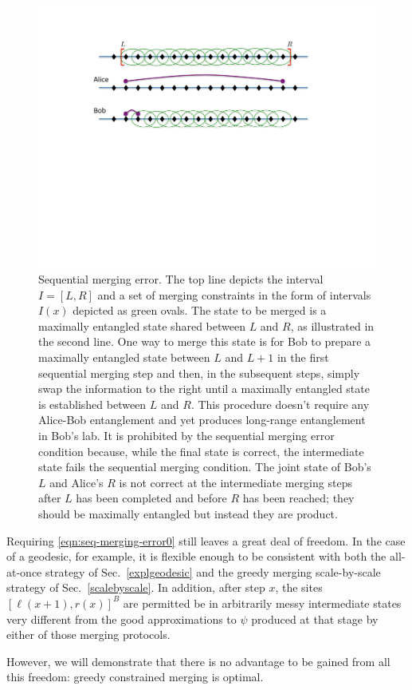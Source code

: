 \documentclass[12pt]{article}
\newcommand{\secref}[1]{Sec.~\ref{#1}}
\begin{document}
\begin{figure}[t!]
\centering
\includegraphics[width=.70\textwidth]{sequential.pdf}
\caption{Sequential merging error. The top line depicts the interval $I = [L,R]$ and a set of merging constraints in the form of intervals $I(x)$ depicted as green ovals. The state to be merged is a maximally entangled state shared between $L$ and $R$, as illustrated in the second line. One way to merge this state is for Bob to prepare a maximally entangled state between $L$ and $L+1$ in the first sequential merging step and then, in the subsequent steps, simply swap the information to the right until a maximally entangled state is established between $L$ and $R$. This procedure doesn't require any Alice-Bob entanglement and yet produces long-range entanglement in Bob's lab. It is prohibited by the sequential merging error condition because, while the final state is correct, the intermediate state fails the sequential merging condition. The joint state of Bob's $L$ and Alice's $R$ is not correct at the intermediate merging steps after $L$ has been completed and before $R$ has been reached; they should be maximally entangled but instead they are product.}
\label{sequential}
\end{figure}

Requiring \eqref{eqn:seq-merging-error0} still leaves a great deal of freedom. In the case of a geodesic, for example, it is flexible enough to be consistent with both the all-at-once strategy of \secref{explgeodesic} and the greedy merging scale-by-scale strategy of \secref{scalebyscale}. In addition, after step $x$, the sites $[\ell(x+1),r(x)]^B$ are permitted be in arbitrarily messy intermediate states very different from the good approximations to $\psi$ produced at that stage by either of those merging protocols.

However, we will demonstrate that there is no advantage to be gained from all this freedom: greedy constrained merging is optimal.
\end{document}

